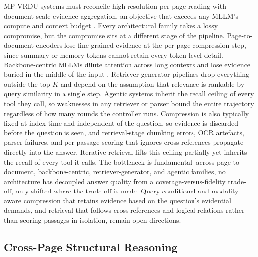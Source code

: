 \documentclass[11pt]{article}
\begin{document}
MP-VRDU systems must reconcile high-resolution per-page reading with document-scale evidence aggregation, an objective that exceeds any MLLM's compute and context budget \cite{ma2024mmlongbenchdoc}. Every architectural family takes a lossy compromise, but the compromise sits at a different stage of the pipeline. Page-to-document encoders lose fine-grained evidence at the per-page compression step, since summary or memory tokens cannot retain every token-level detail. Backbone-centric MLLMs dilute attention across long contexts and lose evidence buried in the middle of the input \cite{liu2024lost}. Retriever-generator pipelines drop everything outside the top-$K$ and depend on the assumption that relevance is rankable by query similarity in a single step. Agentic systems inherit the recall ceiling of every tool they call, so weaknesses in any retriever or parser bound the entire trajectory regardless of how many rounds the controller runs. Compression is also typically fixed at index time and independent of the question, so evidence is discarded before the question is seen, and retrieval-stage chunking errors, OCR artefacts, parser failures, and per-passage scoring that ignores cross-references propagate directly into the answer. Iterative retrieval lifts this ceiling partially yet inherits the recall of every tool it calls. The bottleneck is fundamental: across page-to-document, backbone-centric, retriever-generator, and agentic families, no architecture has decoupled answer quality from a coverage-versus-fidelity trade-off, only shifted where the trade-off is made. Query-conditional and modality-aware compression that retains evidence based on the question's evidential demands, and retrieval that follows cross-references and logical relations rather than scoring passages in isolation, remain open directions.

\subsection{Cross-Page Structural Reasoning}
\end{document}
